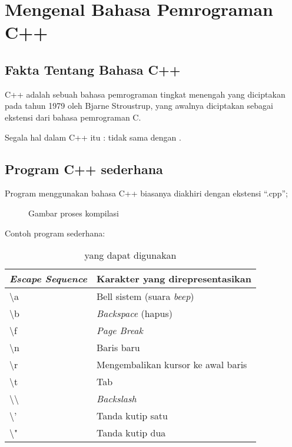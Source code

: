 \documentclass[../main.tex]{subfiles}
\begin{document}
\chapter{Mengenal Bahasa Pemrograman C++}
\section{Fakta Tentang Bahasa C++}
C++ adalah sebuah bahasa pemrograman tingkat menengah yang diciptakan pada tahun
1979 oleh Bjarne Stroustrup, yang awalnya diciptakan sebagai ekstensi dari
bahasa pemrograman C.

Segala hal dalam C++ itu :  tidak sama
dengan .

\section{Program C++ sederhana}
Program menggunakan bahasa C++ biasanya diakhiri dengan ekstensi \enquote{.cpp};

\begin{figure}
  \centering
  \caption{Gambar proses kompilasi}
  \label{comp-proc}
\end{figure}

Contoh program sederhana:

\begin{table}
\centering
\begin{tabular}{@{} l l @{}}
  \toprule
  \emph{Escape Sequence}  & Karakter yang direpresentasikan  \\
  \midrule
  \textbackslash{}a    & Bell sistem (suara \emph{beep})\\
  \textbackslash{}b    & \emph{Backspace} (hapus)\\
  \textbackslash{}f    & \emph{Page Break}\\
  \textbackslash{}n    & Baris baru\\
  \textbackslash{}r    & Mengembalikan kursor ke awal baris\\
  \textbackslash{}t    & Tab\\
  \textbackslash{}\textbackslash{}    & \emph{Backslash}\\
  \textbackslash{}'    & Tanda kutip satu\\
  \textbackslash{}"    & Tanda kutip dua\\
  \bottomrule
\end{tabular}
\caption{ yang dapat digunakan}
\label{tipe-escape}
\end{table}
\end{document}
